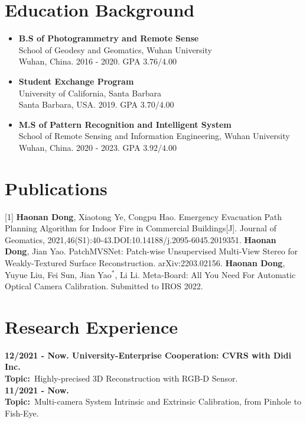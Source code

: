 \documentclass[a4paper]{article}
\begin{document}
\section{Education Background}
\vspace{-0.5em}
\begin{itemize}[itemsep = -0.5em,topsep = 0em]
      \item \textbf{B.S of Photogrammetry and Remote Sense}
            \\ School of Geodesy and Geomatics, Wuhan University\\ Wuhan, China. 2016 - 2020. GPA $3.76/4.00$
      \item \textbf{Student Exchange Program}
            \\ University of California, Santa Barbara\\ Santa Barbara, USA. 2019. GPA $3.70/4.00$
      \item \textbf{M.S of Pattern Recognition and Intelligent System}
            \\ School of Remote Sensing and Information Engineering, Wuhan University\\ Wuhan, China. 2020 - 2023. GPA $3.92/4.00$
\end{itemize}


\section{Publications}
\vspace{-0.5em}
[1] \textbf{Haonan Dong}, Xiaotong Ye, Congpu Hao. Emergency Evacuation Path Planning Algorithm for Indoor Fire in Commercial Buildings[J]. Journal of Geomatics, 2021,46(S1):40-43.DOI:10.14188/j.2095-6045.2019351.
\newline
[2] \textbf{Haonan Dong}, Jian Yao. PatchMVSNet: Patch-wise Unsupervised Multi-View Stereo for
Weakly-Textured Surface Reconstruction. arXiv:2203.02156.
\newline
[3] \textbf{Haonan Dong}, Yuyue Liu, Fei Sun, Jian Yao$^{*}$, Li Li. Meta-Board: All You Need For Automatic Optical Camera Calibration. Submitted to IROS 2022.


\section{Research Experience}
\vspace{-0.5em}
\textbf{12/2021 - Now. University-Enterprise Cooperation: CVRS with Didi Inc.}\\
\textbf{Topic:}\ Highly-precised 3D Reconstruction with RGB-D Sensor.\\
\textbf{11/2021 - Now.}\\
\textbf{Topic:}\ Multi-camera System Intrinsic and Extrinsic Calibration, from Pinhole to Fish-Eye.\\
\end{document}
